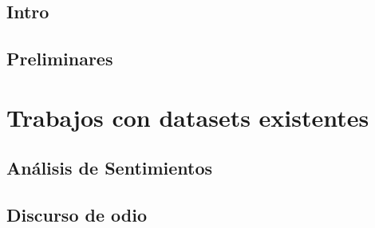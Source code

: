\documentclass[11pt,a4paper,twoside]{tesis}
\begin{document}

\def\autor{Juan Manuel Pérez}
\def\tituloTesis{Técnicas y recursos para la detección de lenguaje discriminatorio en redes sociales}
\def\runtitulo{Técnicas y recursos para la detección de lenguaje discriminatorio en redes sociales}
\def\runtitle{Star Wars: Rebellion and Empire}
\def\director{Franco Luque}
\def\codirector{Agustín Gravano}
\def\lugar{Buenos Aires, 2021}


\frontmatter
\pagestyle{empty}


\cleardoublepage

\cleardoublepage

\cleardoublepage

\cleardoublepage
\tableofcontents

\mainmatter
\pagestyle{headings}



\chapter{Intro}


\chapter{Preliminares}

\part{Trabajos con datasets existentes}

\chapter{Análisis de Sentimientos}


\chapter{Discurso de odio}


% 
\end{document}

